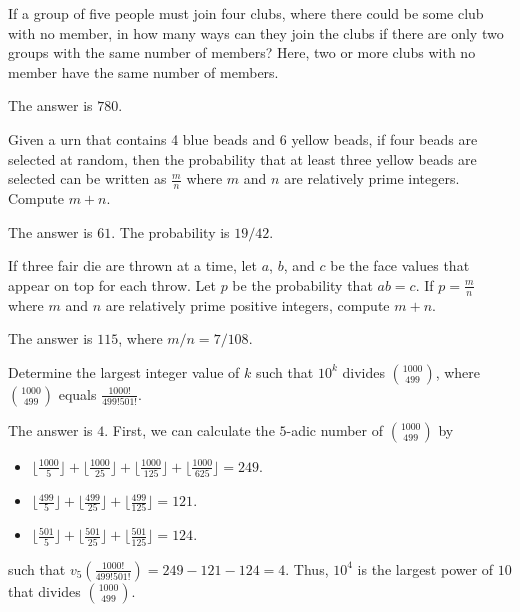 \begin{problem}
If a group of five people must join four clubs, where there could be some club with no member, in how many ways can they join the clubs if there are only two groups with the same number of members? Here, two or more clubs with no member have the same number of members.
\end{problem}

\begin{solution}
The answer is $780$.
\end{solution}

\begin{problem}
Given a urn that contains 4 blue beads and 6 yellow beads, if four beads are selected at random, then the probability that at least three yellow beads are selected can be written as $\frac{m}{n}$ where $m$ and $n$ are relatively prime integers. Compute $m+n$.
\end{problem}

\begin{solution}
The answer is $61$. The probability is $19/42$.
\end{solution}

\begin{problem}
If three fair die are thrown at a time, let $a$, $b$, and $c$ be the face values that appear on top for each throw. Let $p$ be the probability that $ab=c$. If $p=\frac{m}{n}$ where $m$ and $n$ are relatively prime positive integers, compute $m+n$.
\end{problem}

\begin{solution}
The answer is $115$, where $m/n = 7/108$.
\end{solution}

\begin{problem}
Determine the largest integer value of $k$ such that $10^k$ divides $\binom{1000}{499}$, where $\binom{1000}{499}$ equals $\frac{1000!}{{499!}{501!}}$.
\end{problem}

\begin{solution}
The answer is $4$. First, we can calculate the $5$-adic number of $\binom{1000}{499}$ by
\begin{itemize}
\item $\lfloor \frac{1000}{5}\rfloor + \lfloor \frac{1000}{25} \rfloor + \lfloor \frac{1000}{125} \rfloor + \lfloor \frac{1000}{625} \rfloor = 249$.
\item $\lfloor \frac{499}{5}\rfloor + \lfloor \frac{499}{25} \rfloor + \lfloor \frac{499}{125} \rfloor = 121$.
\item $\lfloor \frac{501}{5}\rfloor + \lfloor \frac{501}{25} \rfloor + \lfloor \frac{501}{125} \rfloor = 124$.
\end{itemize}
such that $v_5(\frac{1000!}{499!501!})=249-121-124=4$. Thus, $10^4$ is the largest power of $10$ that divides $\binom{1000}{499}$.
\end{solution}

